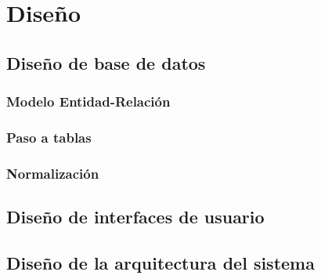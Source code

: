 \chapter{Diseño}

\section{Diseño de base de datos}

\subsection{Modelo Entidad-Relación}

\subsection{Paso a tablas}

\subsection{Normalización}

\section{Diseño de interfaces de usuario}

\section{Diseño de la arquitectura del sistema}
